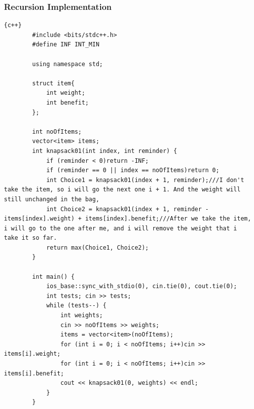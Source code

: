 \subsubsection{Recursion Implementation}
\begin{lstlisting}{c++}
        #include <bits/stdc++.h>
        #define INF INT_MIN
        
        using namespace std;
        
        struct item{
        	int weight;
        	int benefit;
        };
        
        int noOfItems;
        vector<item> items;
        int knapsack01(int index, int reminder) {
        	if (reminder < 0)return -INF;
        	if (reminder == 0 || index == noOfItems)return 0;
        	int Choice1 = knapsack01(index + 1, reminder);///I don't take the item, so i will go the next one i + 1. And the weight will still unchanged in the bag,
        	int Choice2 = knapsack01(index + 1, reminder - items[index].weight) + items[index].benefit;///After we take the item, i will go to the one after me, and i will remove the weight that i take it so far.
        	return max(Choice1, Choice2);
        }
        
        int main() {
        	ios_base::sync_with_stdio(0), cin.tie(0), cout.tie(0);
        	int tests; cin >> tests;
        	while (tests--) {
        		int weights;
        		cin >> noOfItems >> weights;
        		items = vector<item>(noOfItems);
        		for (int i = 0; i < noOfItems; i++)cin >> items[i].weight;
        		for (int i = 0; i < noOfItems; i++)cin >> items[i].benefit;
        		cout << knapsack01(0, weights) << endl;
        	}
        }
\end{lstlisting}

